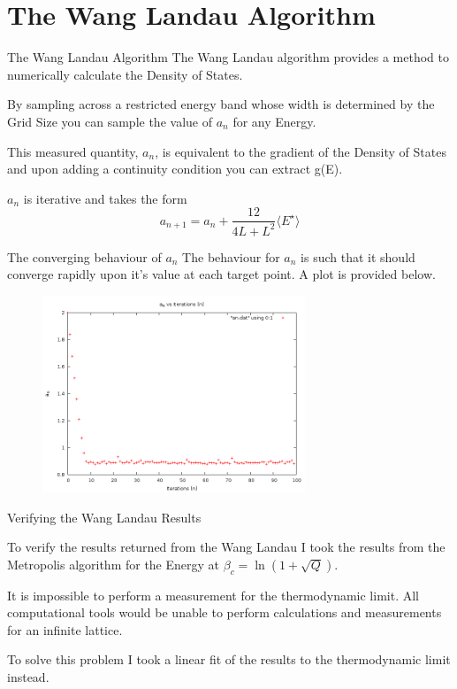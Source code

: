 \documentclass[12pt]{beamer}
\begin{document}
\section{The Wang Landau Algorithm}
\begin{frame}{The Wang Landau Algorithm}
The Wang Landau algorithm provides a method to numerically calculate the Density of States.

By sampling across a restricted energy band whose width is determined by the Grid Size you can sample the value of $a_n$ for any Energy.

This measured quantity, $a_n$, is equivalent to the gradient of the Density of States and upon adding a continuity condition you can extract g(E).

$a_n$ is iterative and takes the form
\begin{equation}
a_{n+1} = a_n + \frac{12}{4L+L^2}\langle E^\star \rangle
\end{equation}

\end{frame}

\begin{frame}{The converging behaviour of $a_n$}
The behaviour for $a_n$ is such that it should converge rapidly upon it's value at each target point. A plot is provided below.
\begin{figure}
\centering
\includegraphics[width=0.7\textwidth]{An16x16Convergence.png}
\end{figure}

\end{frame}


\begin{frame}{Verifying the Wang Landau Results}

To verify the results returned from the Wang Landau I took the results from the Metropolis algorithm for the Energy at $\beta_c = \ln{(1+\sqrt{Q})}$.

It is impossible to perform a measurement for the thermodynamic limit. All computational tools would be unable to perform calculations and measurements for an infinite lattice.

To solve this problem I took a linear fit of the results to the thermodynamic limit instead.
\end{frame}
\end{document}
